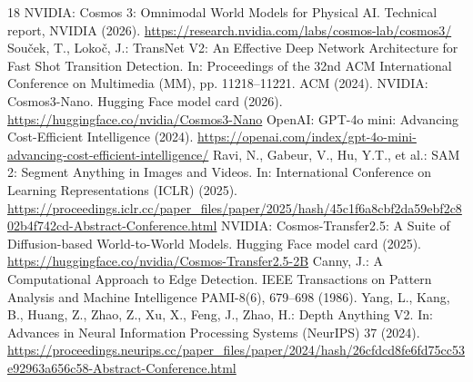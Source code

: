 \documentclass[runningheads]{llncs}
\begin{document}
\begin{thebibliography}{18}
 NVIDIA: Cosmos 3: Omnimodal World Models for Physical AI. Technical report, NVIDIA (2026). \url{https://research.nvidia.com/labs/cosmos-lab/cosmos3/}
 Sou\v{c}ek, T., Loko\v{c}, J.: TransNet V2: An Effective Deep Network Architecture for Fast Shot Transition Detection. In: Proceedings of the 32nd ACM International Conference on Multimedia (MM), pp. 11218--11221. ACM (2024). 
 NVIDIA: Cosmos3-Nano. Hugging Face model card (2026). \url{https://huggingface.co/nvidia/Cosmos3-Nano}
 OpenAI: GPT-4o mini: Advancing Cost-Efficient Intelligence (2024). \url{https://openai.com/index/gpt-4o-mini-advancing-cost-efficient-intelligence/}
 Ravi, N., Gabeur, V., Hu, Y.T., et al.: SAM 2: Segment Anything in Images and Videos. In: International Conference on Learning Representations (ICLR) (2025). \url{https://proceedings.iclr.cc/paper_files/paper/2025/hash/45c1f6a8cbf2da59ebf2c802b4f742cd-Abstract-Conference.html}
 NVIDIA: Cosmos-Transfer2.5: A Suite of Diffusion-based World-to-World Models. Hugging Face model card (2025). \url{https://huggingface.co/nvidia/Cosmos-Transfer2.5-2B}
 Canny, J.: A Computational Approach to Edge Detection. IEEE Transactions on Pattern Analysis and Machine Intelligence PAMI-8(6), 679--698 (1986). 
 Yang, L., Kang, B., Huang, Z., Zhao, Z., Xu, X., Feng, J., Zhao, H.: Depth Anything V2. In: Advances in Neural Information Processing Systems (NeurIPS) 37 (2024). \url{https://proceedings.neurips.cc/paper_files/paper/2024/hash/26cfdcd8fe6fd75cc53e92963a656c58-Abstract-Conference.html}
\end{thebibliography}
\end{document}
